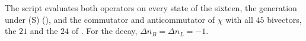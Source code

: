 The script evaluates both operators on every state of the sixteen, the generation under (S) (), and the commutator and anticommutator of $\chi$ with all $45$ bivectors, the $21$ and the $24$ of . For the decay, $\Delta n_{B} = \Delta n_{L} = -1$.
